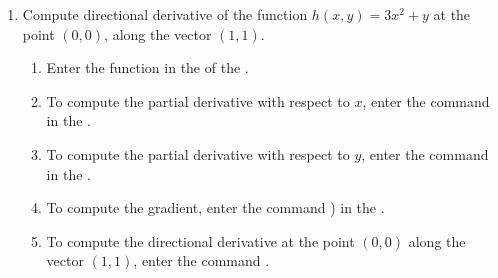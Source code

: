 \begin{enumerate}[leftmargin=*]

\item Compute directional derivative of the function $h(x,y)= 3x^2+y$ at the point $(0,0)$, along the vector $(1,1)$.
      \begin{indication}
      \begin{enumerate}
      \item Enter the function  in the  of the .
      \item To compute the partial derivative with respect to $x$, enter the command  in the .
      \item To compute the partial derivative with respect to $y$, enter the command  in the .
      \item To compute the gradient, enter the command ) in the .
      \item To compute the directional derivative at the point $(0,0)$ along the vector $(1,1)$, enter the command .
      \end{enumerate}
      \end{indication}


\end{enumerate}
